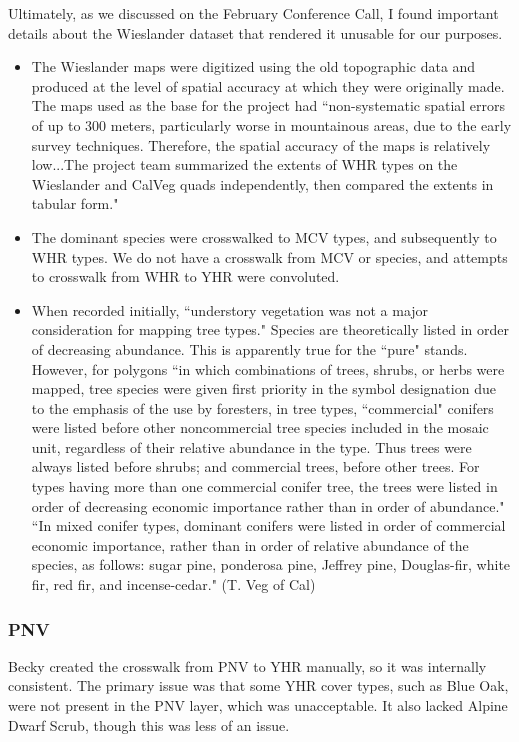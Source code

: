 Ultimately, as we discussed on the February Conference Call, I found important details about the Wieslander dataset that rendered it unusable for our purposes.
\begin{itemize}
\item The Wieslander maps were digitized using the old topographic data and produced at the level of spatial accuracy at which they were originally made. The maps used as the base for the project had ``non-systematic spatial errors of up to 300 meters, particularly worse in mountainous areas, due to the early survey techniques. Therefore, the spatial accuracy of the maps is relatively low...The project team summarized the extents of WHR types on the Wieslander and CalVeg quads independently, then compared the extents in tabular form."
\item The dominant species were crosswalked to MCV types, and subsequently to WHR types. We do not have a crosswalk from MCV or species, and attempts to crosswalk from WHR to YHR were convoluted.
\item When recorded initially, ``understory vegetation was not a major consideration for mapping tree types." Species are theoretically listed in order of decreasing abundance. This is apparently true for the ``pure" stands. However, for polygons ``in which combinations of trees, shrubs, or herbs were mapped, tree species were given first priority in the symbol designation due to the emphasis of the use by foresters, in tree types, ``commercial" conifers were listed before other noncommercial tree species included in the mosaic unit, regardless of their relative abundance in the type. Thus trees were always listed before shrubs; and commercial trees, before other trees. For types having more than one commercial conifer tree, the trees were listed in order of decreasing economic importance rather than in order of abundance." ``In mixed conifer types, dominant conifers were listed in order of commercial economic importance, rather than in order of relative abundance of the species, as follows: sugar pine, ponderosa pine, Jeffrey pine, Douglas-fir, white fir, red fir, and incense-cedar." (T. Veg of Cal)
\end{itemize}

\subsubsection{PNV}
Becky created the crosswalk from PNV to YHR manually, so it was internally consistent. The primary issue was that some YHR cover types, such as Blue Oak, were not present in the PNV layer, which was unacceptable. It also lacked Alpine Dwarf Scrub, though this was less of an issue.

